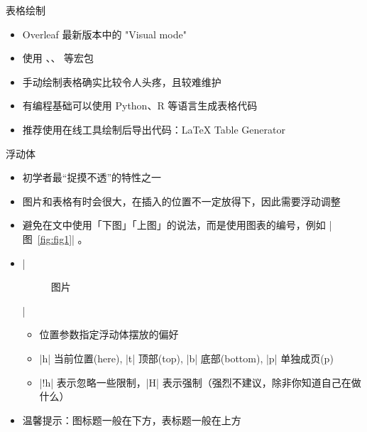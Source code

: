     \begin{frame}[fragile]{表格绘制}
      \begin{itemize}
        \item Overleaf 最新版本中的 "Visual mode"
        \item 使用 、、 等宏包
        \item 手动绘制表格确实比较令人头疼，且较难维护
        \item 有编程基础可以使用 Python、R 等语言生成表格代码
        \item 推荐使用在线工具绘制后导出代码：\LaTeX{} Table Generator 
      \end{itemize}
    \end{frame}
    
    \begin{frame}[fragile]{浮动体}
    \begin{itemize}
    \item 初学者最“捉摸不透”的特性之一 
    \item 图片和表格有时会很大，在插入的位置不一定放得下，因此需要浮动调整
    \item 避免在文中使用「下图」「上图」的说法，而是使用图表的编号，例如 |图~\ref{fig:fig1}| 。
    \item |\begin{figure}[<位置>] 图片 \end{figure}|
      \begin{itemize}
      \item 位置参数指定浮动体摆放的偏好
      \item |h| 当前位置(here), |t| 顶部(top), |b| 底部(bottom), |p| 单独成页(p)
      \item |!h| 表示忽略一些限制，|H| 表示强制\alert{（强烈不建议，除非你知道自己在做什么）}
      \end{itemize}
    \item 温馨提示：图标题一般在下方，表标题一般在上方
    \end{itemize}
    \end{frame}
    
